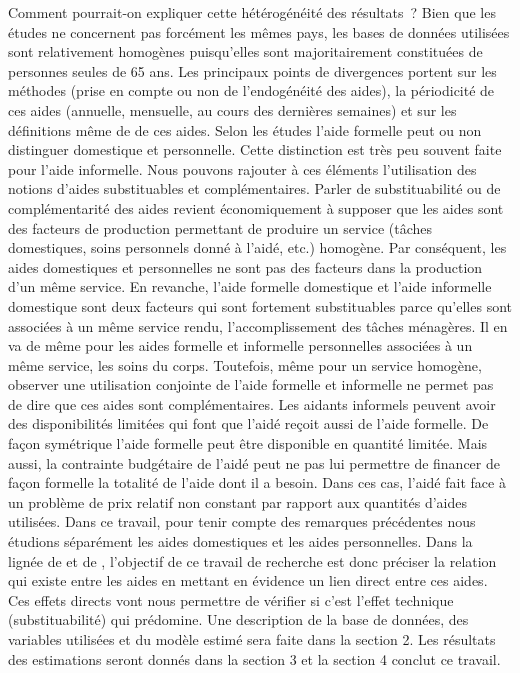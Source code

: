 \begin{Article}
\begin{refsection}[Bonnal]
Comment pourrait-on expliquer cette hétérogénéité des résultats~? Bien que les études ne concernent pas forcément les mêmes pays, les bases de données utilisées sont relativement homogènes puisqu’elles sont majoritairement constituées de personnes seules de 65 ans. Les principaux points de divergences portent sur les méthodes (prise en compte ou non de l’endogénéité des aides), la périodicité de ces aides (annuelle, mensuelle, au cours des dernières semaines) et sur les définitions même de de ces aides. Selon les études l’aide formelle peut ou non distinguer domestique et personnelle. Cette distinction est très peu souvent faite pour l’aide informelle. Nous pouvons rajouter à ces éléments l’utilisation des notions d’aides substituables et complémentaires. Parler de substituabilité ou de complémentarité des aides revient économiquement à supposer que les aides sont des facteurs de production permettant de produire un service (tâches domestiques, soins personnels donné à l’aidé, etc.) homogène. Par conséquent, les aides domestiques et personnelles ne sont pas des facteurs dans la production d'un même service. En revanche, l’aide formelle domestique et l’aide informelle domestique sont deux facteurs qui sont fortement substituables parce qu’elles sont associées à un même service rendu, l'accomplissement des tâches ménagères. Il en va de même pour les aides formelle et informelle personnelles associées à un même service, les soins du corps. Toutefois, même pour un service homogène, observer une utilisation conjointe de l’aide formelle et informelle ne permet pas de dire que ces aides sont complémentaires. Les aidants informels peuvent avoir des disponibilités limitées qui font que l’aidé reçoit aussi de l’aide formelle. De façon symétrique l'aide formelle peut être disponible en quantité limitée. Mais aussi, la contrainte budgétaire de l’aidé peut ne pas lui permettre de financer de façon formelle la totalité de l’aide dont il a besoin. Dans ces cas, l’aidé fait face à un problème de prix relatif non constant par rapport aux quantités d'aides utilisées. Dans ce travail, pour tenir compte des remarques précédentes nous étudions séparément les aides domestiques et les aides personnelles. Dans la lignée de \textcite{BALIA2014} et de \textcite{BARNAY2016}, l’objectif de ce travail de recherche est donc préciser la relation qui existe entre les aides en mettant en évidence un lien direct entre ces aides. Ces effets directs vont nous permettre de vérifier si c'est l'effet technique (substituabilité) qui prédomine. Une description de la base de données, des variables utilisées et du modèle estimé sera faite dans la section 2. Les résultats des estimations seront donnés dans la section 3 et la section 4 conclut ce travail.


\end{refsection}
\end{Article}
